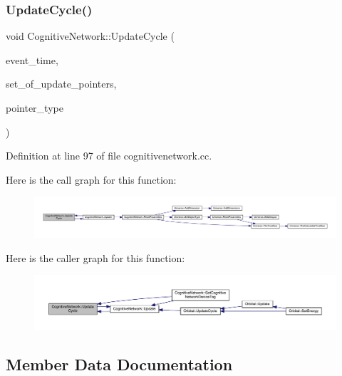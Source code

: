 \subsubsection{\texorpdfstring{Update\+Cycle()}{UpdateCycle()}}
{\footnotesize\ttfamily void Cognitive\+Network\+::\+Update\+Cycle (\begin{DoxyParamCaption}\item[{std\+::chrono\+::time\+\_\+point$<$ \hyperlink{universe_8h_a0ef8d951d1ca5ab3cfaf7ab4c7a6fd80}{Clock} $>$}]{event\+\_\+time,  }\item[{std\+::vector$<$ \hyperlink{class_cognitive_network}{Cognitive\+Network} $\ast$$>$}]{set\+\_\+of\+\_\+update\+\_\+pointers,  }\item[{unsigned int}]{pointer\+\_\+type }\end{DoxyParamCaption})}



Definition at line 97 of file cognitivenetwork.\+cc.

Here is the call graph for this function\+:
\nopagebreak
\begin{figure}[H]
\begin{center}
\leavevmode
\includegraphics[width=350pt]{class_cognitive_network_aa37dda869174e4eef986cca4ce3e55d2_cgraph}
\end{center}
\end{figure}
Here is the caller graph for this function\+:
\nopagebreak
\begin{figure}[H]
\begin{center}
\leavevmode
\includegraphics[width=350pt]{class_cognitive_network_aa37dda869174e4eef986cca4ce3e55d2_icgraph}
\end{center}
\end{figure}


\subsection{Member Data Documentation}
\mbox{\label{class_cognitive_network_a5a46cefb188858fdc023df3abbac0a47}} 
